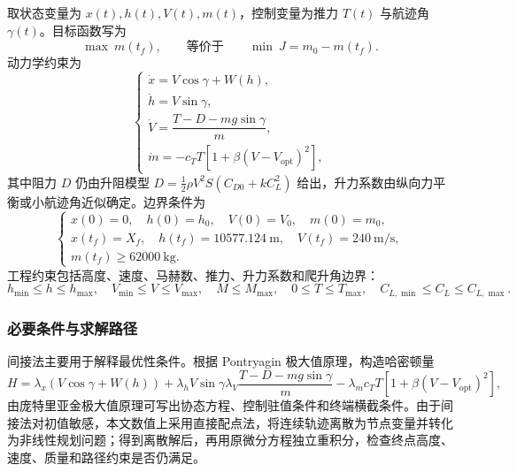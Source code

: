 \documentclass[withoutpreface,bwprint]{cumcmthesis}
\begin{document}
取状态变量为 $x(t),h(t),V(t),m(t)$，控制变量为推力 $T(t)$ 与航迹角 $\gamma(t)$。目标函数写为
\begin{equation}
\max\ m(t_f),
\qquad \text{等价于}\qquad
\min\ J=m_0-m(t_f).
\label{eq:q3_objective}
\end{equation}
动力学约束为
\begin{equation}
\begin{cases}
\dot x=V\cos\gamma+W(h),\\[3pt]
\dot h=V\sin\gamma,\\[3pt]
\dot V=\dfrac{T-D-mg\sin\gamma}{m},\\[8pt]
\dot m=-c_T T\left[1+\beta\left(V-V_{\mathrm{opt}}\right)^2\right],
\end{cases}
\label{eq:q3_dynamics}
\end{equation}
其中阻力 $D$ 仍由升阻模型 $D=\tfrac12\rho V^2S(C_{D0}+kC_L^2)$ 给出，升力系数由纵向力平衡或小航迹角近似确定。边界条件为
\begin{equation}
\begin{cases}
x(0)=0,\quad h(0)=h_0,\quad V(0)=V_0,\quad m(0)=m_0,\\
x(t_f)=X_f,\quad h(t_f)=10577.124\ \mathrm{m},\quad V(t_f)=240\ \mathrm{m/s},\\
m(t_f)\geq62000\ \mathrm{kg}.
\end{cases}
\label{eq:q3_boundary}
\end{equation}
工程约束包括高度、速度、马赫数、推力、升力系数和爬升角边界：
\begin{equation}
h_{\min}\leq h\leq h_{\max},\quad
V_{\min}\leq V\leq V_{\max},\quad
M\leq M_{\max},\quad
0\leq T\leq T_{\max},\quad
C_{L,\min}\leq C_L\leq C_{L,\max}.
\label{eq:q3_path_constraints}
\end{equation}

\subsubsection{必要条件与求解路径}

间接法主要用于解释最优性条件。根据 Pontryagin 极大值原理，构造哈密顿量\cite{pontryagin}
\begin{equation}
H=\lambda_x(V\cos\gamma+W(h))+\lambda_hV\sin\gamma
\lambda_V\frac{T-D-mg\sin\gamma}{m}
-\lambda_m c_TT\left[1+\beta(V-V_{\mathrm{opt}})^2\right],
\label{eq:q3_hamiltonian}
\end{equation}
由庞特里亚金极大值原理可写出协态方程、控制驻值条件和终端横截条件。由于间接法对初值敏感，本文数值上采用直接配点法，将连续轨迹离散为节点变量并转化为非线性规划问题\cite{hargraves,betts}；得到离散解后，再用原微分方程独立重积分，检查终点高度、速度、质量和路径约束是否仍满足。
\end{document}

